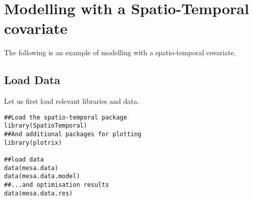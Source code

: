 \section{Modelling with a Spatio-Temporal covariate}  
\label{app:pred_ST_covar}
The following is an example of modelling with a spatio\hyp{}temporal covariate.

\subsection{Load Data}
Let us first load relevant libraries and data.
\vspace*{-0.5\baselineskip}
\begin{verbatim}
##Load the spatio-temporal package
library(SpatioTemporal)
##And additional packages for plotting
library(plotrix) 

##load data
data(mesa.data)
data(mesa.data.model)
##...and optimisation results
data(mesa.data.res)
\end{verbatim}

